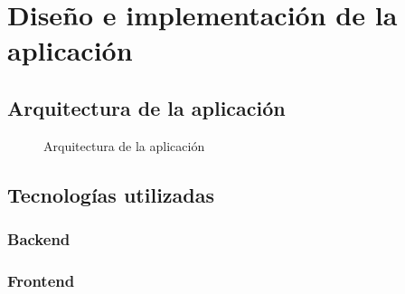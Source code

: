 \chapter{Diseño e implementación de la aplicación}

\section{Arquitectura de la aplicación}

\begin{figure}[htb]
\centering
\arquitectura
\caption{Arquitectura de la aplicación}
\label{fig:arquitectura}
\end{figure}

\section{Tecnologías utilizadas}

\subsection{Backend}

\subsection{Frontend}